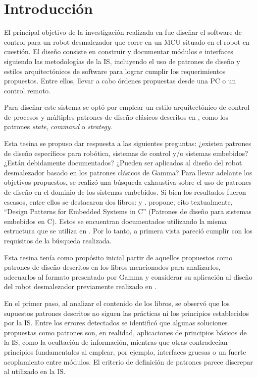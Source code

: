 \chapter{Introducción}

El principal objetivo de la investigación realizada en \cite{paperPomponio} fue diseñar el software de control para un robot desmalezador que corre en un \gls{MCU} situado en el robot en cuestión. El diseño consiste en construir y documentar módulos e interfaces siguiendo las metodologías de la \gls{IS}, incluyendo el uso de patrones de diseño y estilos arquitectónicos de software para lograr cumplir los requerimientos propuestos. Entre ellos, llevar a cabo órdenes propuestas desde una PC o un control remoto.

Para diseñar este sistema se optó por emplear un estilo arquitectónico de control de procesos \cite[pág. 27]{ShawGarlan1996} y múltiples patrones de diseño clásicos descritos en \cite{Gamma:1995:DPE:186897}, como los patrones \textit{state}, \textit{command} o \textit{strategy}.

Esta tesina se propuso dar respuesta a las siguientes preguntas: ¿existen patrones de diseño específicos para robótica, sistemas de control y/o sistemas embebidos? ¿Están debidamente documentados? ¿Pueden ser aplicados al diseño del robot desmalezador basado en los patrones clásicos de Gamma? Para llevar adelante los objetivos propuestos, se realizó una búsqueda exhaustiva sobre el uso de patrones de diseño en el dominio de los sistemas embebidos. Si bien los resultados fueron escasos,  entre ellos se destacaron dos libros: \cite{douglass} y \cite{elecia-embedded}. \cite{douglass} propone, cito textualmente, ``Design Patterns for Embedded Systems in C'' (Patrones de diseño para sistemas embebidos en C). Estos se encuentran documentados utilizando la misma estructura que se utiliza en \cite{Gamma:1995:DPE:186897}. Por lo tanto, a primera vista pareció cumplir con los requisitos de la búsqueda realizada.

Esta tesina tenía como propósito inicial partir de aquellos propuestos como patrones de diseño descritos en los libros mencionados para analizarlos, adecuarlos al formato presentado por Gamma \cite{Gamma:1995:DPE:186897} y considerar su aplicación al diseño del robot desmalezador previamente realizado en \cite{paperPomponio}.

En el primer paso, al analizar el contenido de los libros, se observó que los supuestos patrones descritos no siguen las prácticas ni los principios establecidos por la IS. Entre los errores detectados se identificó que algunas soluciones propuestas como patrones son, en realidad, aplicaciones de principios básicos de la \gls{IS}, como la ocultación de información, mientras que otras contradecían principios fundamentales al emplear, por ejemplo, interfaces gruesas o un fuerte acoplamiento entre módulos. El criterio de definición de patrones parece discrepar al utilizado en la \gls{IS}.

